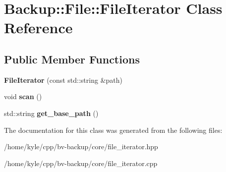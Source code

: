 \hypertarget{class_backup_1_1_file_1_1_file_iterator}{}\section{Backup\+:\+:File\+:\+:File\+Iterator Class Reference}
\label{class_backup_1_1_file_1_1_file_iterator}
\subsection*{Public Member Functions}
\begin{DoxyCompactItemize}
\item 
\mbox{\label{class_backup_1_1_file_1_1_file_iterator_abd32f40496c43881fa9ad718e971b7cf}} 
{\bfseries File\+Iterator} (const std\+::string \&path)
\item 
\mbox{\label{class_backup_1_1_file_1_1_file_iterator_ab98615126c4197146fd561621268ae0c}} 
void {\bfseries scan} ()
\item 
\mbox{\label{class_backup_1_1_file_1_1_file_iterator_a6dd7a72e190aeca2aab94149582e9e4e}} 
std\+::string {\bfseries get\+\_\+base\+\_\+path} ()
\end{DoxyCompactItemize}


The documentation for this class was generated from the following files\+:\begin{DoxyCompactItemize}
\item 
/home/kyle/cpp/bv-\/backup/core/file\+\_\+iterator.\+hpp\item 
/home/kyle/cpp/bv-\/backup/core/file\+\_\+iterator.\+cpp\end{DoxyCompactItemize}
